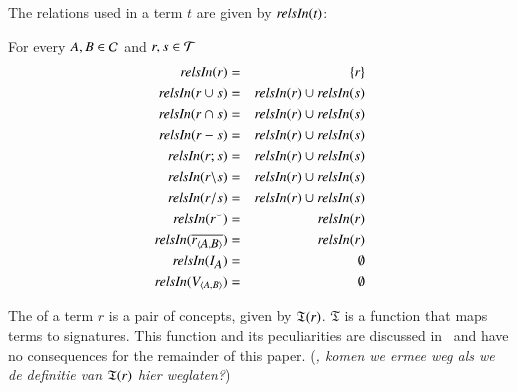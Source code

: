 \documentclass{elsarticle}
\begin{document}
	The relations used in a term $t$ are given by $\text{\it relsIn\/}(t)$:
\begin{definition}
	\label{relations in terms}
	\item   For every $A,B\in\mathcal{C}$ and $r,s\in\mathcal{T}$
	\begin{eqnarray*}
		\text{\it relsIn\/}(r)		 &=&\{r\}	\\
		\text{\it relsIn\/}(r \cup s)	 &=&\text{\it relsIn\/}(r)\cup\text{\it relsIn\/}(s)\\
		\text{\it relsIn\/}(r \cap s)	 &=&\text{\it relsIn\/}(r)\cup\text{\it relsIn\/}(s)\\
		\text{\it relsIn\/}(r-s)	 &=&\text{\it relsIn\/}(r)\cup\text{\it relsIn\/}(s)\\
		\text{\it relsIn\/}(r;s)	 &=&\text{\it relsIn\/}(r)\cup\text{\it relsIn\/}(s)\\
		\text{\it relsIn\/}(r\backslash s)	 &=&\text{\it relsIn\/}(r)\cup\text{\it relsIn\/}(s)\\
		\text{\it relsIn\/}(r\slash s)	 &=&\text{\it relsIn\/}(r)\cup\text{\it relsIn\/}(s)\\
		\text{\it relsIn\/}({r}^\smallsmile)	 &=&\text{\it relsIn\/}(r)\\
		\text{\it relsIn\/}(\overline{\text{\it r\/}_{\langle{\text{\it \small A\/}},{\text{\it \small B\/}}\rangle}})	 &=&\text{\it relsIn\/}(r)\\
		\text{\it relsIn\/}(I_{\text{\it \small A\/}}) 	 &=&\emptyset\\
		\text{\it relsIn\/}(V_{\langle{A},{B}\rangle})&=&\emptyset\\
	\end{eqnarray*}
\end{definition}
	The  of a term $r$ is a pair of concepts, given by $\mathfrak{T}(r)$.
	$\mathfrak{T}$ is a function that maps terms to signatures.
	This function and its peculiarities are discussed in~\cite{Joosten2015}
	and have no consequences for the remainder of this paper.
	(\emph{\@Bas, komen we ermee weg als we de definitie van $\mathfrak{T}(r)$ hier weglaten?})
\end{document}
